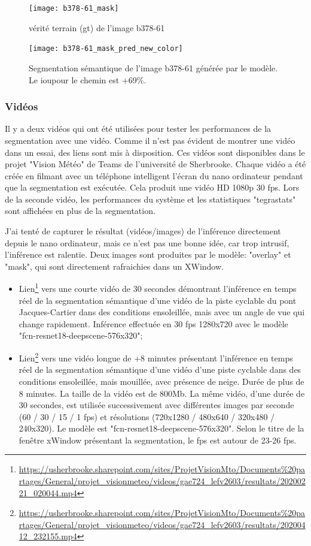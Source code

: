 \begin{figure}[H]
   \centering
   \texttt{[image: b378-61\_mask]}
   \caption{vérité terrain (\acrshort{gt}) de l'image b378-61}
   \label{fig:b378-61_mask}
\end{figure}
\begin{figure}[H]
   \centering
   \texttt{[image: b378-61\_mask\_pred\_new\_color]}
   \caption{Segmentation sémantique de l'image b378-61 générée par le modèle. Le \acrshort{iou}pour le chemin est +69\%.}
   \label{fig:b378-61_mask_pred_new_color}
\end{figure}
\subsubsection{Vidéos}
\par Il y a deux vidéos qui ont été utilisées pour tester les performances de la segmentation avec une vidéo. Comme il n'est pas évident de montrer une vidéo dans un essai, des liens sont mis à disposition. Ces vidéos sont disponibles dans le projet "Vision Météo" de Teams de l'université de Sherbrooke. Chaque vidéo a été créée en filmant avec un téléphone intelligent l'écran du nano ordinateur pendant que la segmentation est exécutée. Cela produit une vidéo HD 1080p 30 \acrshort{fps}. Lors de la seconde vidéo, les performances du système et les statistiques "tegrastats" sont affichées en plus de la segmentation.
\par J'ai tenté de capturer le résultat (vidéos/images) de l'inférence directement depuis le nano ordinateur, mais ce n'est pas une bonne idée, car trop intrusif, l'inférence est ralentie. Deux images sont produites par le modèle: "overlay" et "mask", qui sont directement rafraichies dans un XWindow. 
\begin{itemize}
   \item Lien\footnote{\url{https://usherbrooke.sharepoint.com/sites/ProjetVisionMto/Documents\%20partages/General/projet_visionmeteo/videos/gae724_lefv2603/resultats/20200221_020044.mp4}} vers une courte vidéo de 30 secondes démontrant l'inférence en temps réel de la segmentation sémantique d'une vidéo de la piste cyclable du pont Jacques-Cartier dans des conditions ensoleillée, mais avec un angle de vue qui change rapidement. Inférence effectuée en 30 \acrshort{fps} 1280x720 avec le modèle "fcn-resnet18-deepscene-576x320";
   \item Lien\footnote{\url{https://usherbrooke.sharepoint.com/sites/ProjetVisionMto/Documents\%20partages/General/projet_visionmeteo/videos/gae724_lefv2603/resultats/20200412_232155.mp4}} vers une vidéo longue de +8 minutes présentant l'inférence en temps réel de la segmentation sémantique d'une vidéo d'une piste cyclable dans des conditions ensoleillée, mais mouillée, avec présence de neige. Durée de plus de 8 minutes. La taille de la vidéo est de 800Mb. La même vidéo, d'une durée de 30 secondes, est utilisée successivement avec différentes images par seconde (60 / 30 / 15 / 1 \acrshort{fps}) et résolutions (720x1280 / 480x640 / 320x480 / 240x320). Le modèle est "fcn-resnet18-deepscene-576x320". Selon le titre de la fenêtre xWindow présentant la segmentation, le \acrshort{fps} est autour de 23-26 \acrshort{fps}.
\end{itemize}
